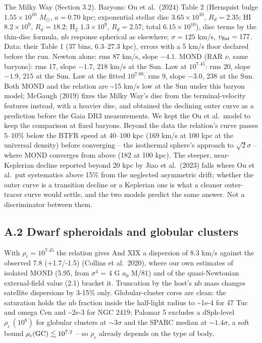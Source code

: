 \documentclass[
  10pt,
]{article}
\begin{document}
The Milky Way (Section 3.2). Baryons: Ou et al.~(2024) Table 2 (Hernquist bulge $1.55\times10^{10}$ $M_\odot$, $a=0.70$ kpc; exponential stellar disc $3.65\times10^{10}$, $R_d=2.35$; HI $8.2\times10^{9}$, $R_d=18.2$; H$_2$ $1.3\times10^{9}$, $R_d=2.57$; total $6.15\times10^{10}$), disc terms by the thin-disc formula, nb response spherical as elsewhere; $\sigma=125$ km/s, $v_{\rm flat}=177$. Data: their Table 1 (37 bins, 6.3--27.3 kpc), errors with a 5 km/s floor declared before the run. Newton alone: rms 87 km/s, slope $-4.1$. MOND (RAR $\nu$, same baryons): rms 17, slope $-1.7$, 218 km/s at the Sun. Law at $10^{7.45}$: rms 20, slope $-1.9$, 215 at the Sun. Law at the fitted $10^{7.88}$: rms 9, slope $-3.0$, 238 at the Sun. Both MOND and the relation are \textasciitilde{}15 km/s low at the Sun under this baryon model; McGaugh (2019) fixes the Milky Way's disc from the terminal-velocity features instead, with a heavier disc, and obtained the declining outer curve as a prediction before the Gaia DR3 measurements. We kept the Ou et al.\ model to keep the comparison at fixed baryons. Beyond the data the relation's curve passes 5--10\% below the BTFR speed at 40--100 kpc (169 km/s at 100 kpc at the universal density) before converging -- the isothermal sphere's approach to $\sqrt{2}\sigma$ -- where MOND converges from above (182 at 100 kpc). The steeper, near-Keplerian decline reported beyond 20 kpc by Jiao et al.~(2023) falls where Ou et al.\ put systematics above 15\% from the neglected asymmetric drift; whether the outer curve is a transition decline or a Keplerian one is what a cleaner outer-tracer curve would settle, and the two models predict the same answer. Not a discriminator between them.

\subsection{A.2 Dwarf spheroidals and globular clusters}\label{dwarf-spheroidals-and-globular-clusters}

With $\rho_c=10^{7.45}$ the relation gives And XIX a dispersion of 8.3 km/s
against the observed 7.8 (+1.7/-1.5) (Collins et al.~2020), where our own estimates of isolated MOND (5.95, from
$\sigma^4$ = 4 G $a_0$ M/81) and of the quasi-Newtonian external-field
value (2.1) bracket it.
Truncation by the host's nb mass changes satellite dispersions by 3-15\%
only. Globular-cluster cores are clean: the
saturation holds the nb fraction inside the half-light radius to
\textasciitilde{}1e-4 for 47 Tuc and omega Cen and \textasciitilde{}2e-3 for
NGC 2419; Palomar 5 excludes a dSph-level $\rho_c\,(10^{8})$ for globular clusters
at $\sim3\sigma$ and the SPARC median at $\sim1.4\sigma$, a soft bound $\rho_c({\rm GC})\lesssim 10^{7.2}$ --
so $\rho_c$ already depends on the type of body.
\end{document}
